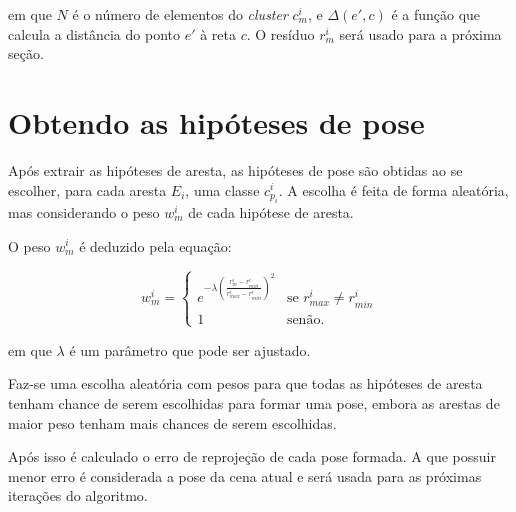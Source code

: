 em que $N$ é o número de elementos do \emph{cluster} $c^i_m$, e $\Delta (e', c)$ é a função que calcula a distância do ponto $e'$ à reta $c$. O resíduo $r^i_m$ será usado para a próxima seção.

\section{Obtendo as hipóteses de pose}

Após extrair as hipóteses de aresta, as hipóteses de pose são obtidas ao se escolher, para cada aresta $E_i$, uma classe $c^i_{p_i}$. A escolha é feita de forma aleatória, mas considerando o peso $w^i_m$ de cada hipótese de aresta.

O peso $w^i_m$ é deduzido pela equação:

\begin{equation}
w^i_m = \begin{cases}
    e^{-\lambda \left( \frac{r^i_m - r^i_{min}}{r^i_{max} - r^i_{min}}\right)^2 } & \mbox{se } r^i_{max} \neq r^i_{min} \\
    1 & \mbox{senão}.
\end{cases}
\end{equation}

em que $\lambda$ é um parâmetro que pode ser ajustado.

Faz-se uma escolha aleatória com pesos para que todas as hipóteses de aresta tenham chance de serem escolhidas para formar uma pose, embora as arestas de maior peso tenham mais chances de serem escolhidas.

Após isso é calculado o erro de reprojeção de cada pose formada. A que possuir menor erro é considerada a pose da cena atual e será usada para as próximas iterações do algoritmo.

